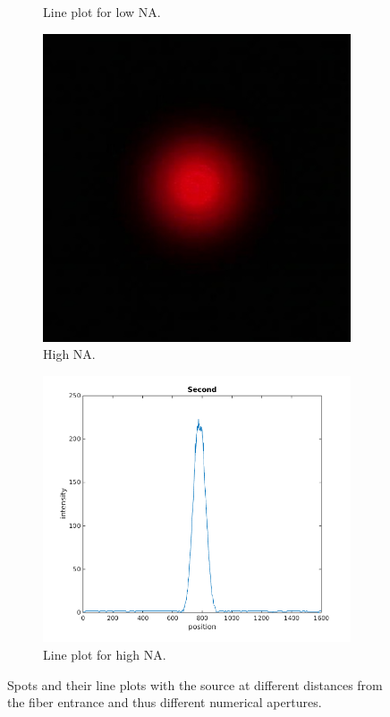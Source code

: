\documentclass[a4paper, 12pt]{paper}
\begin{document}
\begin{figure}[H]
\begin{subfigure}[t]{0.45\textwidth}
        \caption{Line plot for low NA.}
    \end{subfigure}
    \begin{subfigure}[t]{0.40\textwidth}
        \includegraphics[width=\textwidth]{img/second.jpg}
        \caption{High NA.}
    \end{subfigure}
    \begin{subfigure}[t]{0.45\textwidth}
        \includegraphics[width=\textwidth]{img/second_line}
        \caption{Line plot for high NA.}
    \end{subfigure}
    \caption{Spots and their line plots with the source at different distances from the fiber entrance and thus different numerical apertures.}
\label{fig:different_NAs}
\end{figure}
\end{document}

